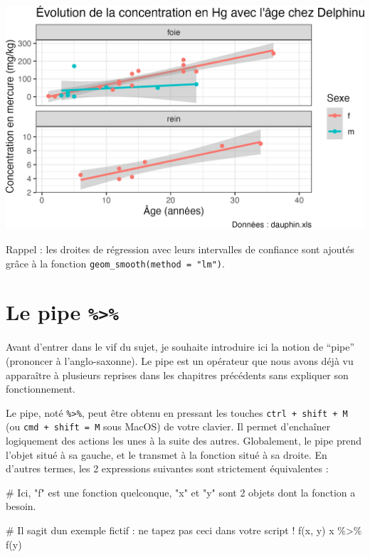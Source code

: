 \documentclass[
  letterpaper,
  DIV=11,
  numbers=noendperiod]{scrreprt}
\newenvironment{Shaded}{\begin{snugshade}}{\end{snugshade}}
\newcommand{\CommentTok}[1]{\textcolor[rgb]{0.37,0.37,0.37}{#1}}
\newcommand{\FunctionTok}[1]{\textcolor[rgb]{0.28,0.35,0.67}{#1}}
\newcommand{\NormalTok}[1]{\textcolor[rgb]{0.00,0.23,0.31}{#1}}
\newcommand{\SpecialCharTok}[1]{\textcolor[rgb]{0.37,0.37,0.37}{#1}}
\begin{document}
\includegraphics{./04-DataWrangling_files/figure-pdf/unnamed-chunk-10-1.png}

Rappel : les droites de régression avec leurs intervalles de confiance
sont ajoutés grâce à la fonction \texttt{geom\_smooth(method\ =\ "lm")}.

\hypertarget{le-pipe}{%
\section{\texorpdfstring{Le pipe
\texttt{\%\textgreater{}\%}}{Le pipe \%\textgreater\%}}\label{le-pipe}}

Avant d'entrer dans le vif du sujet, je souhaite introduire ici la
notion de ``pipe'' (prononcer à l'anglo-saxonne). Le pipe est un
opérateur que nous avons déjà vu apparaître à plusieurs reprises dans
les chapitres précédents sans expliquer son fonctionnement.

Le pipe, noté \texttt{\%\textgreater{}\%}, peut être obtenu en pressant
les touches \texttt{ctrl\ +\ shift\ +\ M} (ou
\texttt{cmd\ +\ shift\ =\ M} sous MacOS) de votre clavier. Il permet
d'enchaîner logiquement des actions les unes à la suite des autres.
Globalement, le pipe prend l'objet situé à sa gauche, et le transmet à
la fonction situé à sa droite. En d'autres termes, les 2 expressions
suivantes sont strictement équivalentes :

\begin{Shaded}
\begin{Highlighting}[]
\CommentTok{\# Ici, "f" est une fonction quelconque, "x" et "y" sont 2 objets dont la fonction a besoin.}

\CommentTok{\# Il s\textquotesingle{}agit d\textquotesingle{}un exemple fictif : ne tapez pas ceci dans votre script !}
\FunctionTok{f}\NormalTok{(x, y)}
\NormalTok{x }\SpecialCharTok{\%\textgreater{}\%} \FunctionTok{f}\NormalTok{(y)}
\end{Highlighting}
\end{Shaded}
\end{document}
